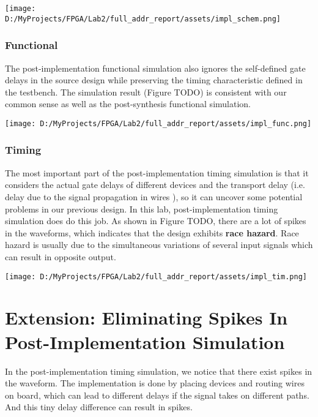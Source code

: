 \documentclass[
]{article}
\begin{document}
\texttt{[image: D:/MyProjects/FPGA/Lab2/full\_addr\_report/assets/impl\_schem.png]}

\hypertarget{functional-2}{%
\subsubsection{Functional}\label{functional-2}}

The post-implementation functional simulation also ignores the
self-defined gate delays in the source design while preserving the
timing characteristic defined in the testbench. The simulation result
(Figure TODO) is consistent with our common sense as well as the
post-synthesis functional simulation.

\texttt{[image: D:/MyProjects/FPGA/Lab2/full\_addr\_report/assets/impl\_func.png]}

\hypertarget{timing-2}{%
\subsubsection{Timing}\label{timing-2}}

The most important part of the post-implementation timing simulation is
that it considers the actual gate delays of different devices and the
transport delay (i.e. delay due to the signal propagation in wires ), so
it can uncover some potential problems in our previous design. In this
lab, post-implementation timing simulation does do this job. As shown in
Figure TODO, there are a lot of spikes in the waveforms, which indicates
that the design exhibits \textbf{race hazard}. Race hazard is usually
due to the simultaneous variations of several input signals which can
result in opposite output.

\texttt{[image: D:/MyProjects/FPGA/Lab2/full\_addr\_report/assets/impl\_tim.png]}

\hypertarget{extension-eliminating-spikes-in-post-implementation-simulation}{%
\section{Extension: Eliminating Spikes In Post-Implementation
Simulation}\label{extension-eliminating-spikes-in-post-implementation-simulation}}

In the post-implementation timing simulation, we notice that there exist
spikes in the waveform. The implementation is done by placing devices
and routing wires on board, which can lead to different delays if the
signal takes on different paths. And this tiny delay difference can
result in spikes.
\end{document}
